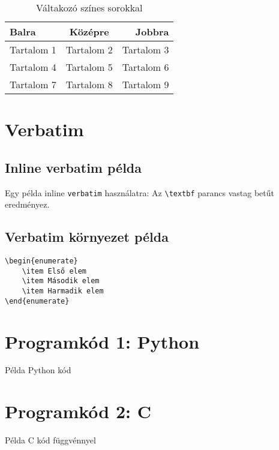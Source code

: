 \documentclass[12pt]{article}
\begin{document}
\begin{table}[h]
    \centering
    \begin{tabular}{|l|c|r|}
        \hline
        Balra & Középre & Jobbra \\
        \hline
        Tartalom 1 & Tartalom 2 & Tartalom 3 \\
        Tartalom 4 & Tartalom 5 & Tartalom 6 \\
        Tartalom 7 & Tartalom 8 & Tartalom 9 \\
        \hline
    \end{tabular}
    \caption{Váltakozó színes sorokkal}
    \label{tab:color_table}
\end{table}

\section{Verbatim}

\subsection{Inline verbatim példa}
Egy példa inline \texttt{verbatim} használatra: Az \verb|\textbf| parancs vastag betűt eredményez.

\subsection{Verbatim környezet példa}

\begin{verbatim}
\begin{enumerate}
    \item Első elem
    \item Második elem
    \item Harmadik elem
\end{enumerate}
\end{verbatim}

\section{Programkód 1: Python}

\begin{PythonCode}
    \caption{Példa Python kód}
    \label{lst:python_example}
    
\end{PythonCode}

\section{Programkód 2: C}

\begin{CCode}
    \caption{Példa C kód függvénnyel}
    \label{lst:c_example}
    
\end{CCode}
\end{document}
